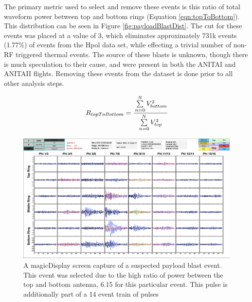		The primary metric used to select and remove these events is this ratio of total waveform power between top and bottom rings (Equation \ref{eqn:topToBottom}). This distribution can be seen in Figure \ref{fig:payloadBlastDist}.  The cut for these events was placed at a value of 3, which eliminates approximately 731k  events (1.77\%) of events from the Hpol data set, while effecting a trivial number of non-RF triggered thermal events.  The source of these blasts is unknown, though there is much speculation to their cause, and were present in both the ANITAI and ANITAII flights.  Removing these events from the dataset is done prior to all other analysis steps.  
		
\begin{equation}
	R_{topToBottom} = \cfrac{\sum\limits_{n=0}^{N} V^{2}_{bottom}}{\sum\limits_{n=0}^{N} V^{2}_{top}}
	\label{eqn:topToBottom}
\end{equation}
		
\begin{figure}
	\centering
	\includegraphics[height=0.5\textheight]{figures/payloadBlast}
	\caption{A magicDisplay screen capture of a suspected payload blast event.  This event was selected due to the high ratio of power between the top and bottom antenna, 6.15 for this particular event.  This pulse is additionally part of a 14 event train of pulses}
	\label{fig:payloadBlast}
\end{figure}

